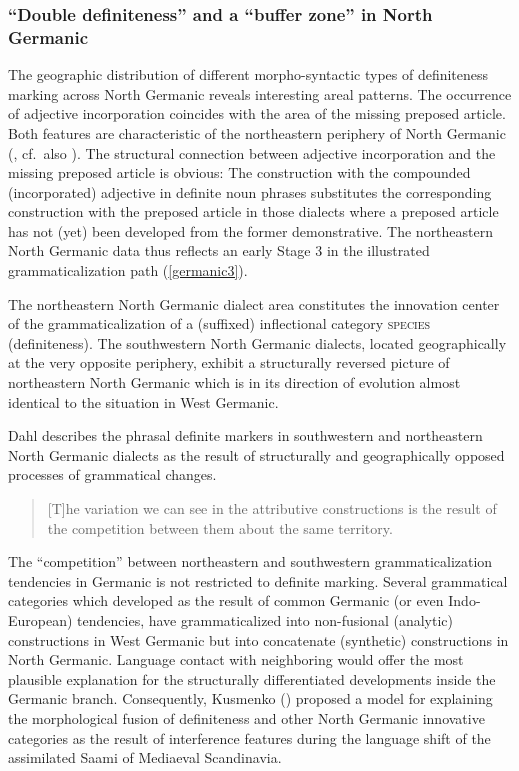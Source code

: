{
\subsubsection{“Double definiteness” and a “buffer zone” in North Germanic}\label{buffer}
The geographic distribution of different morpho-syntactic types of definiteness marking across North Germanic reveals interesting areal patterns. The occurrence of adjective incorporation coincides with the area of the missing preposed article. Both features are characteristic of the northeastern periphery of North Germanic (\citealt{delsing1996b}, cf.~also \citealt{riesler2001a,riesler2002a}). The structural connection between adjective incorporation and the missing preposed article is obvious: The construction with the compounded (incorporated) adjective in definite noun phrases substitutes the corresponding construction with the preposed article in those dialects where a preposed article has not (yet) been developed from the former demonstrative. The northeastern North Germanic data thus reflects an early Stage 3 in the illustrated grammaticalization path (\ref{germanic3}).

The northeastern North Germanic dialect area constitutes the innovation center of the grammaticalization of a (suffixed) inflectional category \textsc{species} (definiteness). The southwestern North Germanic dialects, located geographically at the very opposite periphery, exhibit a structurally reversed picture of northeastern North Germanic which is in its direction of evolution almost identical to the situation in West Germanic.

Dahl describes the phrasal definite markers in southwestern and northeastern North Germanic dialects as the result of structurally and geographically opposed processes of grammatical changes.
\begin{quote}
[T]he variation we can see in the attributive constructions is the result of the competition between them about the same territory. \citep[147]{dahl2003}
\end{quote}
The “competition” between northeastern and southwestern grammaticalization tendencies in Germanic is not restricted to definite marking. Several grammatical categories which developed as the result of common Germanic (or even Indo-European) tendencies, have grammaticalized into non-fusional (analytic) constructions in West Germanic but into concatenate (synthetic) constructions in North Germanic. Language contact with neighboring  would offer the most plausible explanation for the structurally differentiated developments inside the Germanic branch. Consequently, Kusmenko (\citeyear{kusmenko2008}) proposed a model for explaining the morphological fusion of definiteness and other North Germanic innovative categories as the result of interference features during the language shift of the assimilated Saami of Mediaeval Scandinavia.

}
